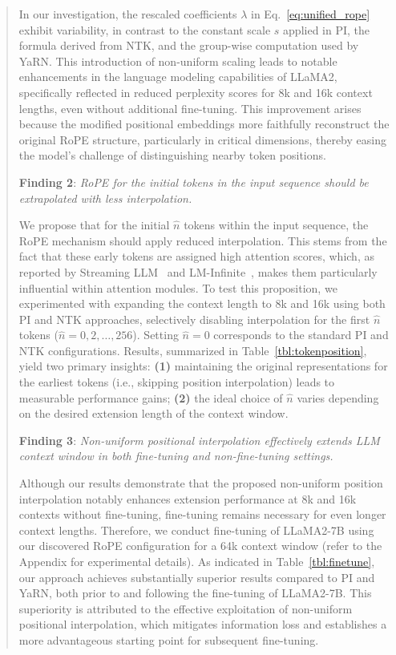 \begin{abstract}
In our investigation, the rescaled coefficients $\lambda$ in Eq.~\ref{eq:unified_rope} exhibit variability, in contrast to the constant scale $s$ applied in PI, the formula derived from NTK, and the group-wise computation used by YaRN. This introduction of non-uniform scaling leads to notable enhancements in the language modeling capabilities of LLaMA2, specifically reflected in reduced perplexity scores for 8k and 16k context lengths, even without additional fine-tuning. This improvement arises because the modified positional embeddings more faithfully reconstruct the original RoPE structure, particularly in critical dimensions, thereby easing the model's challenge of distinguishing nearby token positions.

\textbf{Finding 2}: \textit{RoPE for the initial tokens in the input sequence should be extrapolated with less interpolation.} 

We propose that for the initial $\hat{n}$ tokens within the input sequence, the RoPE mechanism should apply reduced interpolation. This stems from the fact that these early tokens are assigned high attention scores, which, as reported by Streaming LLM~\cite{streamingllm} and LM-Infinite~\cite{han2023lminfinite}, makes them particularly influential within attention modules. To test this proposition, we experimented with expanding the context length to 8k and 16k using both PI and NTK approaches, selectively disabling interpolation for the first $\hat n$ tokens ($\hat n = 0, 2, \ldots, 256$). Setting $\hat n = 0$ corresponds to the standard PI and NTK configurations. Results, summarized in Table~\ref{tbl:tokenposition}, yield two primary insights: \textbf{(1)} maintaining the original representations for the earliest tokens (i.e., skipping position interpolation) leads to measurable performance gains; \textbf{(2)} the ideal choice of $\hat n$ varies depending on the desired extension length of the context window.

\textbf{Finding 3}: \textit{Non-uniform positional interpolation effectively extends LLM context window in both fine-tuning and non-fine-tuning settings.} 

Although our results demonstrate that the proposed non-uniform position interpolation notably enhances extension performance at 8k and 16k contexts without fine-tuning, fine-tuning remains necessary for even longer context lengths. Therefore, we conduct fine-tuning of LLaMA2-7B using our discovered RoPE configuration for a 64k context window (refer to the Appendix for experimental details). As indicated in Table~\ref{tbl:finetune}, our approach achieves substantially superior results compared to PI and YaRN, both prior to and following the fine-tuning of LLaMA2-7B. This superiority is attributed to the effective exploitation of non-uniform positional interpolation, which mitigates information loss and establishes a more advantageous starting point for subsequent fine-tuning.


\end{abstract}
